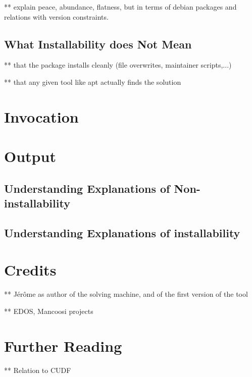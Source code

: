 \documentclass{article}
\begin{document}
** explain peace, abundance, flatness, but in terms of debian packages and
relations with version constraints.

\subsection{What Installability does Not Mean}

** that the package installs cleanly (file overwrites, maintainer scripts,...)

** that any given tool like apt actually finds the solution 


\section{Invocation}
\label{sec:invocation}

\section{Output}
\label{sec:output}

\subsection{Understanding Explanations of Non-installability}

\subsection{Understanding Explanations of installability} 

\section{Credits}
\label{sec:credits}

** Jérôme as author of the solving machine, and of the first version
of the tool

** EDOS, Mancoosi projects 

\section{Further Reading}
** Relation to CUDF
 
\end{document}
